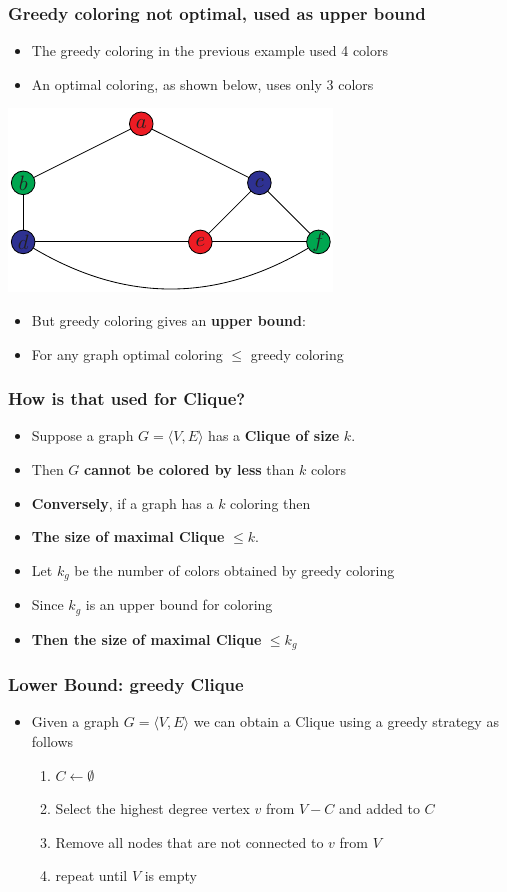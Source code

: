 \documentclass{beamer}
\begin{document}
\begin{frame}
  \frametitle{Greedy coloring not optimal, used as upper bound}
  \begin{itemize}
  \item The greedy coloring in the previous example used 4 colors
  \item An optimal coloring, as shown below, uses only 3 colors
  \end{itemize}
  \begin{center}
    \includegraphics{coping-figs/not-greedy-less}
  \end{center}
  \begin{itemize}
  \item But greedy coloring gives an \textbf{upper bound}:
  \item For any graph optimal coloring $\le $ greedy coloring
  \end{itemize}
\end{frame}
\begin{frame}
  \frametitle{How is that used for Clique?}
  \begin{itemize}
  \item Suppose a graph $G=\langle V,E\rangle$ has a \textbf{Clique of size} $k$.
  \item Then $G$ \textbf{cannot be colored by less} than $k$ colors
  \item \textbf{Conversely}, if a graph has a $k$ coloring then
  \item \textbf{The size of maximal Clique} $\le k$.
  \item Let $k_g$ be the number of colors obtained by greedy coloring
  \item Since $k_g$ is an upper bound for coloring
  \item \textbf{Then the size of maximal Clique} $\le k_g$
  \end{itemize}
\end{frame}
\begin{frame}
  \frametitle{Lower Bound: greedy Clique}
  \begin{itemize}
  \item Given a graph $G=\langle V,E\rangle$ we can obtain a Clique using a greedy strategy as follows
    \begin{enumerate}
    \item $C\leftarrow\emptyset$
    \item Select the highest degree vertex $v$ from $V-C$ and added to $C$
    \item Remove all nodes that are not connected to $v$ from $V$
    \item repeat until $V$ is empty
    \end{enumerate}
  \end{itemize}
\end{frame}
\end{document}

